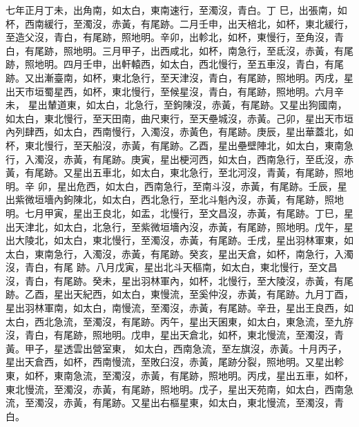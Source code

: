 \begin{pinyinscope}
 七年正月丁未，出角南，如太白，東南速行，至濁沒，青白。丁
 巳，出張南，如杯，西南緩行，至濁沒，赤黃，有尾跡。二月壬申，出天棓北，如杯，東北緩行，至造父沒，青白，有尾跡，照地明。辛卯，出軫北，如杯，東慢行，至角沒，青白，有尾跡，照地明。三月甲子，出西咸北，如杯，南急行，至氐沒，赤黃，有尾跡，照地明。四月壬申，出軒轅西，如太白，西北慢行，至五車沒，青白，有尾跡。又出漸臺南，如杯，東北急行，至天津沒，青白，有尾跡，照地明。丙戌，星出天市垣蜀星西，如杯，東北慢行，至候星沒，青白，有尾跡，照地明。六月辛未，
 星出輦道東，如太白，北急行，至鉤陳沒，赤黃，有尾跡。又星出狗國南，如太白，東北慢行，至天田南，曲尺東行，至天壘城沒，赤黃。己卯，星出天市垣內列肆西，如太白，西南慢行，入濁沒，赤黃色，有尾跡。庚辰，星出華蓋北，如杯，東北慢行，至天船沒，赤黃，有尾跡。乙酉，星出壘壁陣北，如太白，東南急行，入濁沒，赤黃，有尾跡。庚寅，星出梗河西，如太白，西南急行，至氐沒，赤黃，有尾跡。又星出五車北，如太白，東北急行，至北河沒，青黃，有尾跡，照地明。辛
 卯，星出危西，如太白，西南急行，至南斗沒，赤黃，有尾跡。壬辰，星出紫微垣墻內鉤陳北，如太白，西北急行，至北斗魁內沒，赤黃，有尾跡，照地明。七月甲寅，星出王良北，如盂，北慢行，至文昌沒，赤黃，有尾跡。丁巳，星出天津北，如太白，北急行，至紫微垣墻內沒，赤黃，有尾跡，照地明。戊午，星出大陵北，如太白，東北慢行，至濁沒，赤黃，有尾跡。壬戌，星出羽林軍東，如太白，東南急行，入濁沒，赤黃，有尾跡。癸亥，星出天倉，如杯，南急行，入濁沒，青白，有尾
 跡。八月戊寅，星出北斗天樞南，如太白，東北慢行，至文昌沒，青白，有尾跡。癸未，星出羽林軍內，如杯，北慢行，至大陵沒，赤黃，有尾跡。乙酉，星出天紀西，如太白，東慢流，至奚仲沒，赤黃，有尾跡。九月丁酉，星出羽林軍南，如太白，南慢流，至濁沒，赤黃，有尾跡。辛丑，星出王良西，如太白，西北急流，至濁沒，有尾跡。丙午，星出天囷東，如太白，東急流，至九斿沒，青白，有尾跡，照地明。戊申，星出天倉北，如杯，東北慢流，至濁沒，青黃。甲子，星透雲出營室東，
 如太白，西南急流，至左旗沒，赤黃。十月丙子，星出天倉西，如杯，西南慢流，至敗臼沒，赤黃，尾跡分裂，照地明。又星出軫東，如杯，東南急流，至濁沒，赤黃，有尾跡，照地明。丙戌，星出五車，如杯，東北慢流，至濁沒，赤黃，有尾跡，照地明。戊子，星出天苑南，如太白，西南急流，至濁沒，赤黃，有尾跡。又星出右樞星東，如太白，東北慢流，至濁沒，青白。




\end{pinyinscope}

